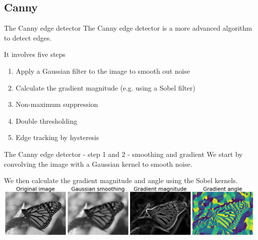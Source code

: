 \documentclass[9pt, aspectratio=169]{beamer}
\begin{document}
\subsection {Canny}
\begin{frame}
    {The Canny edge detector}
    The Canny edge detector is a more advanced algorithm to detect edges.

    It involves five steps

    \begin{enumerate}
        \item Apply a Gaussian filter to the image to smooth out noise
        \item Calculate the gradient magnitude (e.g. using a Sobel filter)
        \item Non-maximum suppression
        \item Double thresholding
        \item Edge tracking by hysteresis
    \end{enumerate}
\end{frame}

\begin{frame}
    {The Canny edge detector - step 1 and 2 - smoothing and gradient}
    We start by convolving the image with a Gaussian kernel to smooth noise.

    We then calculate the gradient magnitude and angle using the Sobel kernels.
    \centering
    \includegraphics[width=\textwidth]{canny_step1-2.png}
\end{frame}
\end{document}
